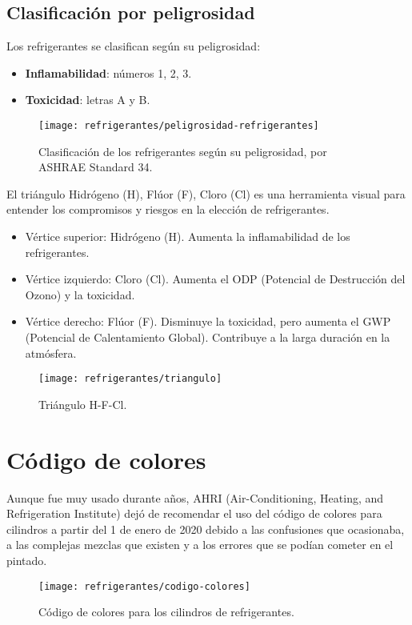 \subsection{Clasificación por peligrosidad}

Los refrigerantes se clasifican según su peligrosidad:
\begin{itemize}
	\item \textbf{Inflamabilidad}: números 1, 2, 3.
	\item \textbf{Toxicidad}: letras A y B.
\end{itemize}
\begin{figure}[h]
	\centering
	\caption{Clasificación de los refrigerantes según su peligrosidad, por ASHRAE Standard 34.}
	\texttt{[image: refrigerantes/peligrosidad-refrigerantes]}
\end{figure}

El triángulo Hidrógeno (H), Flúor (F), Cloro (Cl) es una herramienta visual para entender los compromisos y riesgos en la elección de refrigerantes.

\begin{itemize}
	\item Vértice superior: Hidrógeno (H). Aumenta la inflamabilidad de los refrigerantes.
	\item Vértice izquierdo: Cloro (Cl). Aumenta el ODP (Potencial de Destrucción del Ozono) y la toxicidad.
	\item Vértice derecho: Flúor (F). Disminuye la toxicidad, pero aumenta el GWP (Potencial de Calentamiento Global). Contribuye a la larga duración en la atmósfera.
\end{itemize}

\begin{figure}[H]
	\centering
	\caption{Triángulo H-F-Cl.}
	\texttt{[image: refrigerantes/triangulo]}
\end{figure}
\section{Código de colores}
Aunque fue muy usado durante años, AHRI (Air-Conditioning, Heating, and Refrigeration Institute) dejó de recomendar el uso del código de colores para cilindros a partir del 1 de enero de 2020 debido a las confusiones que ocasionaba, a las complejas mezclas que existen y a los errores que se podían cometer en el pintado.
\begin{figure}[H]
	\centering
	\texttt{[image: refrigerantes/codigo-colores]}
	\caption{Código de colores para los cilindros de refrigerantes.}
\end{figure}
